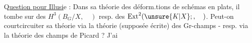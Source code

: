 {\reversemarginpar
{}}

Q\uline{uestion pour Illusi}e : Dans sa théorie des déform.tions de schémas en  plats, il tombe sur des \(H^{3}(B_{G}/X,\quad)\) resp. des \(\operatorname{Ext}^{2}(\unsure{K|X};,\quad)\). Peut-on courtcircuiter sa théorie via la théorie (supposée écrite) des Gr-champs - resp. via la théorie des champs de Picard ? J'ai

{\reversemarginpar
{}}



